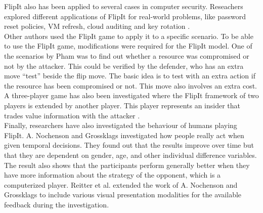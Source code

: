 FlipIt also has been applied to several cases in computer security. Reseachers explored different applications of FlipIt for real-world problems, like password reset policies, VM refresh, cloud auditing and key rotation \cite{ApplyingFlipit}. \\
Other authors used the FlipIt game to apply it to a specific scenario. To be able to use the FlipIt game, modifications were required for the FlipIt model.
One of the scenarios by Pham \cite{compromised} was to find out whether a resource was compromised or not by the attacker. This could be verified by the defender, who has an extra move ``test'' beside the flip move. The basic idea is to test with an extra action if the resource has been compromised or not. This move also involves an extra cost.\\
A three-player game has also been investigated where the FlipIt framework of two players is extended by another player. This player represents an insider that trades value information with the attacker \cite{fengstealthy}.\\


Finally, researchers have also investigated the behaviour of humans playing FlipIt. A. Nochenson and Grossklags \cite{nochenson2013behavioral}  investigated how people really act when given temporal decisions. They found out that the results improve over time but that they are dependent on gender, age, and other individual difference variables. The result also shows that the participants perform generally better when they have more information about the strategy of the opponent, which is a computerized player. Reitter et al. \cite{reitter2013risk} extended the work of A. Nochenson and Grossklags to include various visual presentation modalities for the available feedback during the investigation.\\







